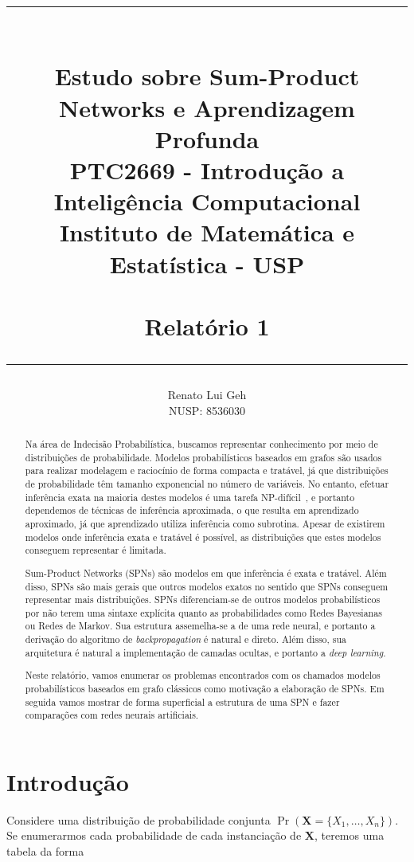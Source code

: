 \documentclass{amsart}
\title{%
  \noindent\rule{10cm}{0.8pt}\\
  Estudo sobre Sum-Product Networks e Aprendizagem Profunda\\[1ex]
  \scriptsize\mdseries
  PTC2669 - Introdução a Inteligência Computacional\\
  Instituto de Matemática e Estatística - USP\\%
  \tiny~\\
  Relatório 1\\%
  \noindent\rule{10cm}{0.8pt}
}
\author[]{Renato Lui Geh\\NUSP\@: 8536030}
\theoremstyle{plain}
\numberwithin{equation}{subsection}
\newcommand{\set}[1]{\mathbf{#1}}
\begin{document}
\begin{abstract}
  Na área de Indecisão Probabilística, buscamos representar conhecimento por meio de distribuições
  de probabilidade. Modelos probabilísticos baseados em grafos são usados para realizar modelagem
  e raciocínio de forma compacta e tratável, já que distribuições de probabilidade têm tamanho
  exponencial no número de variáveis. No entanto, efetuar inferência exata na maioria destes
  modelos é uma tarefa NP-difícil~\cite{inference-nphard}, e portanto dependemos de técnicas de
  inferência aproximada, o que resulta em aprendizado aproximado, já que aprendizado utiliza
  inferência como subrotina. Apesar de existirem modelos onde inferência exata e tratável é
  possível, as distribuições que estes modelos conseguem representar é limitada.

  Sum-Product Networks (SPNs) são modelos em que inferência é exata e tratável. Além disso, SPNs
  são mais gerais que outros modelos exatos no sentido que SPNs conseguem representar mais
  distribuições. SPNs diferenciam-se de outros modelos probabilísticos por não terem uma sintaxe
  explícita quanto as probabilidades como Redes Bayesianas ou Redes de Markov. Sua estrutura
  assemelha-se a de uma rede neural, e portanto a derivação do algoritmo de
  \textit{backpropagation} é natural e direto. Além disso, sua arquitetura é natural a
  implementação de camadas ocultas, e portanto a \textit{deep learning}.

  Neste relatório, vamos enumerar os problemas encontrados com os chamados modelos probabilísticos
  baseados em grafo clássicos como motivação a elaboração de SPNs. Em seguida vamos mostrar de
  forma superficial a estrutura de uma SPN e fazer comparações com redes neurais artificiais.
  \vspace*{-3.5em}
\end{abstract}

\maketitle

\section{Introdução}

Considere uma distribuição de probabilidade conjunta $\Pr(\set{X}=\{X_1,\ldots,X_n\})$. Se
enumerarmos cada probabilidade de cada instanciação de $\set{X}$, teremos uma tabela da forma
\end{document}
